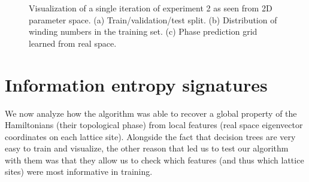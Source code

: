 \documentclass[fleqn,10pt]{wlscirep}
\begin{document}
\begin{figure}
\centering
{}\quad
{}
\caption{Visualization of a single iteration of experiment 2 as seen from 2D parameter space. (a) Train/validation/test split. (b) Distribution of winding numbers in the training set. (c) Phase prediction grid learned from real space.}
\label{figexp2_exp}
\end{figure}

\section*{Information entropy signatures}

We now analyze how the algorithm was able to recover a global property of the Hamiltonians (their topological phase) from local features (real space eigenvector coordinates on each lattice site). Alongside the fact that decision trees are very easy to train and visualize, the other reason that led us to test our algorithm with them was that they allow us to check which features (and thus which lattice sites) were most informative in training.
\end{document}
